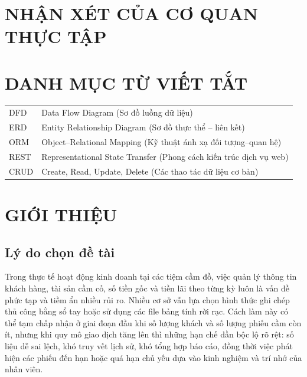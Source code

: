 \documentclass[13pt,a4paper]{extreport}
\begin{document}
\chapter*{NHẬN XÉT CỦA CƠ QUAN THỰC TẬP}


\tableofcontents
{}
\clearpage

\listoftables
{}
\clearpage

\listoffigures
{}
\clearpage

\chapter*{DANH MỤC TỪ VIẾT TẮT}

\begin{longtable}{p{3cm}p{10cm}}
  DFD   & Data Flow Diagram (Sơ đồ luồng dữ liệu)\\
  ERD   & Entity Relationship Diagram (Sơ đồ thực thể -- liên kết)\\
  ORM   & Object--Relational Mapping (Kỹ thuật ánh xạ đối tượng--quan hệ)\\
  REST  & Representational State Transfer (Phong cách kiến trúc dịch vụ web)\\
  CRUD  & Create, Read, Update, Delete (Các thao tác dữ liệu cơ bản)\\
\end{longtable}

\clearpage
{}

\chapter{GIỚI THIỆU}

\section{Lý do chọn đề tài}

Trong thực tế hoạt động kinh doanh tại các tiệm cầm đồ, việc quản lý thông tin khách hàng, tài sản cầm cố, số tiền gốc và tiền lãi theo từng kỳ luôn là vấn đề phức tạp và tiềm ẩn nhiều rủi ro. Nhiều cơ sở vẫn lựa chọn hình thức ghi chép thủ công bằng sổ tay hoặc sử dụng các file bảng tính rời rạc. Cách làm này có thể tạm chấp nhận ở giai đoạn đầu khi số lượng khách và số lượng phiếu cầm còn ít, nhưng khi quy mô giao dịch tăng lên thì những hạn chế dần bộc lộ rõ rệt: số liệu dễ sai lệch, khó truy vết lịch sử, khó tổng hợp báo cáo, đồng thời việc phát hiện các phiếu đến hạn hoặc quá hạn chủ yếu dựa vào kinh nghiệm và trí nhớ của nhân viên.
\end{document}
